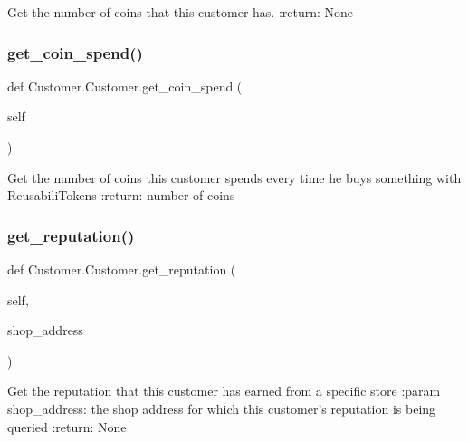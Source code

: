 \begin{DoxyVerb}Get the number of coins that this customer has.
:return: None
\end{DoxyVerb}
 \mbox{\label{class_customer_1_1_customer_a4c3a13a45a42e3179d30c75ccde32ec3}} 
\subsubsection{\texorpdfstring{get\+\_\+coin\+\_\+spend()}{get\_coin\_spend()}}
{\footnotesize\ttfamily def Customer.\+Customer.\+get\+\_\+coin\+\_\+spend (\begin{DoxyParamCaption}\item[{}]{self }\end{DoxyParamCaption})}

\begin{DoxyVerb}Get the number of coins this customer spends every time he buys something with ReusabiliTokens
:return: number of coins
\end{DoxyVerb}
 \mbox{\label{class_customer_1_1_customer_a6053111a21363f88cbd7f296342d450d}} 
\subsubsection{\texorpdfstring{get\+\_\+reputation()}{get\_reputation()}}
{\footnotesize\ttfamily def Customer.\+Customer.\+get\+\_\+reputation (\begin{DoxyParamCaption}\item[{}]{self,  }\item[{}]{shop\+\_\+address }\end{DoxyParamCaption})}

\begin{DoxyVerb}Get the reputation that this customer has earned from a specific store
:param shop_address: the shop address for which this customer's reputation is being queried
:return: None
\end{DoxyVerb}
 \mbox{\label{class_customer_1_1_customer_afde17ca03b3a788bf821f3fa0309fd55}} 
